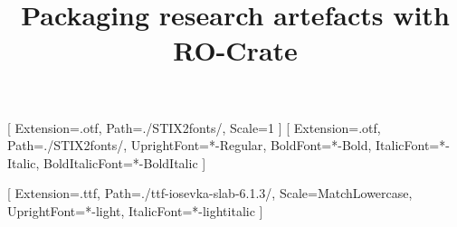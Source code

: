 \documentclass[ds]{iosart2x}
\begin{document}
[
    Extension={.otf},
    Path=./STIX2fonts/,
    Scale=1
]
\setmainfont{STIX2Text}[
    Extension={.otf},
    Path=./STIX2fonts/,
    UprightFont={*-Regular},
    BoldFont={*-Bold},
    ItalicFont={*-Italic},
    BoldItalicFont={*-BoldItalic}
]

\setmonofont{iosevka-slab}[
    Extension={.ttf},
    Path=./ttf-iosevka-slab-6.1.3/,
    Scale=MatchLowercase,
    UprightFont={*-light},
    ItalicFont={*-lightitalic}
]

\begin{frontmatter}

\title{Packaging research artefacts with RO-Crate}



\end{frontmatter}
\end{document}
